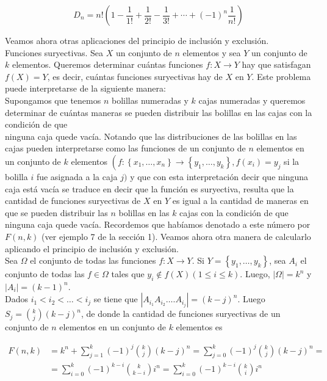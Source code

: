 \documentclass[10pt]{article}
\begin{document}
$$
D_{n}=n!\left(1-\frac{1}{1!}+\frac{1}{2!}-\frac{1}{3!}+\cdots+(-1)^{n} \frac{1}{n!}\right)
$$

Veamos ahora otras aplicaciones del principio de inclusión y exclusión.\\
Funciones suryectivas. Sea $X$ un conjunto de $n$ elementos y sea $Y$ un conjunto de $k$ elementos. Queremos determinar cuántas funciones $f: X \longrightarrow Y$ hay que satisfagan $f(X)=Y$, es decir, cuántas funciones suryectivas hay de $X$ en $Y$. Este problema puede interpretarse de la siguiente manera:\\
Supongamos que tenemos $n$ bolillas numeradas y $k$ cajas numeradas y queremos determinar de cuántas maneras se pueden distribuir las bolillas en las cajas con la condición de que\\
ninguna caja quede vacía. Notando que las distribuciones de las bolillas en las cajas pueden interpretarse como las funciones de un conjunto de $n$ elementos en un conjunto de $k$ elementos $\left(f:\left\{x_{1}, \ldots, x_{n}\right\} \longrightarrow\left\{y_{1}, \ldots, y_{k}\right\}, f\left(x_{i}\right)=y_{j}\right.$ si la bolilla $i$ fue asignada a la caja $j)$ y que con esta interpretación decir que ninguna caja está vacía se traduce en decir que la función es suryectiva, resulta que la cantidad de funciones suryectivas de $X$ en $Y$ es igual a la cantidad de maneras en que se pueden distribuir las $n$ bolillas en las $k$ cajas con la condición de que ninguna caja quede vacía. Recordemos que habíamos denotado a este número por $F(n, k)$ (ver ejemplo 7 de la sección 1). Veamos ahora otra manera de calcularlo aplicando el principio de inclusión y exclusión.\\
Sea $\Omega$ el conjunto de todas las funciones $f: X \longrightarrow Y$. Si $Y=\left\{y_{1}, \ldots, y_{k}\right\}$, sea $A_{i}$ el conjunto de todas las $f \in \Omega$ tales que $y_{i} \notin f(X)(1 \leq i \leq k)$. Luego, $|\Omega|=k^{n}$ y $\left|A_{i}\right|=(k-1)^{n}$.\\
Dados $i_{1}<i_{2}<\ldots<i_{j}$ se tiene que $\left|A_{i_{1}} A_{i_{2}} \ldots . A_{i_{j}}\right|=(k-j)^{n}$. Luego $S_{j}=\binom{k}{j}(k-j)^{n}$, de donde la cantidad de funciones suryectivas de un conjunto de $n$ elementos en un conjunto de $k$ elementos es

$$
\begin{aligned}
F(n, k) & =k^{n}+\sum_{j=1}^{k}(-1)^{j}\binom{k}{j}(k-j)^{n}=\sum_{j=0}^{k}(-1)^{j}\binom{k}{j}(k-j)^{n}= \\
& =\sum_{i=0}^{k}(-1)^{k-i}\binom{k}{k-i} i^{n}=\sum_{i=0}^{k}(-1)^{k-i}\binom{k}{i} i^{n}
\end{aligned}
$$
\end{document}
